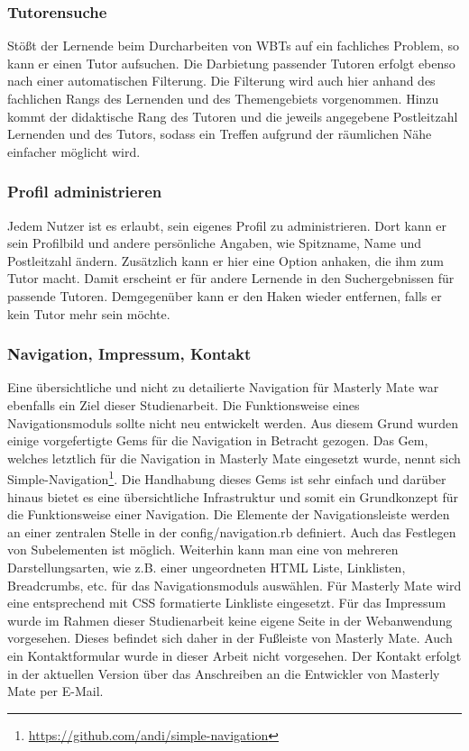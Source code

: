 \subsubsection{Tutorensuche}
Stößt der Lernende beim Durcharbeiten von WBTs auf ein fachliches Problem, so
kann er einen Tutor aufsuchen. Die Darbietung passender Tutoren erfolgt ebenso
nach einer automatischen Filterung. Die Filterung wird auch hier anhand des
fachlichen Rangs des Lernenden und des Themengebiets vorgenommen. Hinzu kommt
der didaktische Rang des Tutoren und die jeweils angegebene Postleitzahl
Lernenden und des Tutors, sodass ein Treffen aufgrund der räumlichen Nähe
einfacher möglicht wird.

\subsubsection{Profil administrieren}
Jedem Nutzer ist es erlaubt, sein eigenes Profil zu administrieren. Dort kann er
sein Profilbild und andere persönliche Angaben, wie Spitzname, Name und
Postleitzahl ändern. Zusätzlich kann er hier eine Option anhaken, die ihm zum
Tutor macht. Damit erscheint er für andere Lernende in den Suchergebnissen für
passende Tutoren. Demgegenüber kann er den Haken wieder entfernen, falls er kein
Tutor mehr sein möchte.

\subsubsection{Navigation, Impressum, Kontakt}
Eine übersichtliche und nicht zu detailierte Navigation für Masterly Mate war
ebenfalls ein Ziel dieser Studienarbeit. Die Funktionsweise eines
Navigationsmoduls sollte nicht neu entwickelt werden. Aus diesem Grund wurden
einige vorgefertigte Gems für die Navigation in Betracht gezogen. Das Gem,
welches letztlich für die Navigation in Masterly Mate eingesetzt wurde, nennt
sich Simple-Navigation\footnote{\url{https://github.com/andi/simple-navigation}}.
Die Handhabung dieses Gems ist sehr einfach und darüber hinaus bietet es eine
übersichtliche Infrastruktur und somit ein Grundkonzept für die Funktionsweise
einer Navigation. Die Elemente der Navigationsleiste werden an einer zentralen
Stelle in der config/navigation.rb definiert. Auch das Festlegen von
Subelementen ist möglich. Weiterhin kann man eine von mehreren 
Darstellungsarten, wie z.B. einer ungeordneten HTML Liste, Linklisten,
Breadcrumbs, etc. für das Navigationsmoduls auswählen. Für Masterly Mate wird
eine entsprechend mit CSS formatierte Linkliste eingesetzt.
Für das Impressum wurde im Rahmen dieser Studienarbeit keine eigene Seite in der
Webanwendung vorgesehen. Dieses befindet sich daher in der Fußleiste von
Masterly Mate. Auch ein Kontaktformular wurde in dieser Arbeit nicht vorgesehen.
Der Kontakt erfolgt in der aktuellen Version über das Anschreiben an die
Entwickler von Masterly Mate per E-Mail. 

